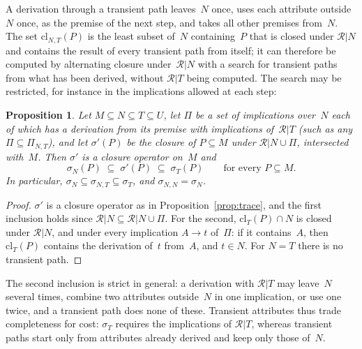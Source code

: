 \documentclass[11pt,a4paper]{article}
\newtheorem{proposition}{Proposition}
\theoremstyle{definition}
\theoremstyle{remark}
\begin{document}
A derivation through a transient path leaves~$N$ once, uses each attribute outside~$N$ once, as the premise of the next step, and takes all other premises from~$N$. The set $\mathrm{cl}_{N,T}(P)$ is the least subset of~$N$ containing~$P$ that is closed under $\mathcal{R}|N$ and contains the result of every transient path from itself; it can therefore be computed by alternating closure under~$\mathcal{R}|N$ with a search for transient paths from what has been derived, without $\mathcal{R}|T$ being computed. The search may be restricted, for instance in the implications allowed at each step:

\begin{proposition}\label{prop:transient-general}
Let $M \subseteq N \subseteq T \subseteq U$, let $\Pi$ be a set of implications over~$N$ each of which has a derivation from its premise with implications of~$\mathcal{R}|T$ (such as any $\Pi \subseteq \Pi_{N,T}$), and let $\sigma'(P)$ be the closure of $P \subseteq M$ under $\mathcal{R}|N \cup \Pi$, intersected with~$M$. Then $\sigma'$ is a closure operator on~$M$ and
\[
  \sigma_N(P) \;\subseteq\; \sigma'(P) \;\subseteq\; \sigma_T(P) \qquad \text{for every } P \subseteq M.
\]
In particular, $\sigma_N \subseteq \sigma_{N,T} \subseteq \sigma_T$, and $\sigma_{N,N} = \sigma_N$.
\end{proposition}

\begin{proof}
$\sigma'$ is a closure operator as in Proposition~\ref{prop:trace}, and the first inclusion holds since $\mathcal{R}|N \subseteq \mathcal{R}|N \cup \Pi$. For the second, $\mathrm{cl}_T(P) \cap N$ is closed under $\mathcal{R}|N$, and under every implication $A \to t$ of~$\Pi$: if it contains~$A$, then $\mathrm{cl}_T(P)$ contains the derivation of~$t$ from~$A$, and $t \in N$. For $N = T$ there is no transient path.
\end{proof}

The second inclusion is strict in general: a derivation with $\mathcal{R}|T$ may leave~$N$ several times, combine two attributes outside~$N$ in one implication, or use one twice, and a transient path does none of these. Transient attributes thus trade completeness for cost: $\sigma_T$ requires the implications of $\mathcal{R}|T$, whereas transient paths start only from attributes already derived and keep only those of~$N$.
\end{document}
